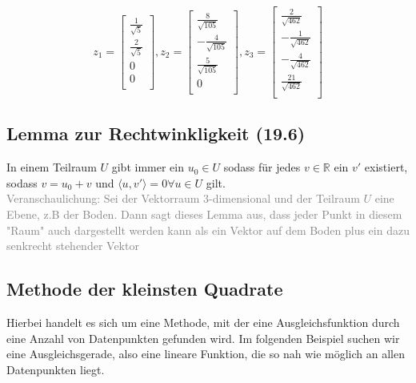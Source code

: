 \documentclass{report}
\begin{document}
				\begin{equation*}
					z_1 = \begin{bmatrix} \frac1{\sqrt{5}} \\ \frac2{\sqrt{5}} \\ 0 \\ 0 \\ \end{bmatrix},
					z_2 = \begin{bmatrix} \frac8{\sqrt{105}} \\ -\frac4{\sqrt{105}} \\ \frac5{\sqrt{105}} \\ 0 \\ \end{bmatrix}, 
					z_3 = \begin{bmatrix} \frac2{\sqrt{462}} \\ -\frac1{\sqrt{462}} \\ -\frac4{\sqrt{462}} \\ \frac{21}{\sqrt{462}} \\ \end{bmatrix}
				\end{equation*}
			\subsection{Lemma zur Rechtwinkligkeit (19.6)}
				In einem Teilraum $U$ gibt immer ein $u_0 \in U$ sodass für jedes $v \in \mathbb{R}$ ein $v'$ existiert, sodass $v = u_0 + v$ und $\langle u, v'\rangle = 0 \forall u \in U$ gilt.\\
				\textcolor{gray}{Veranschaulichung: Sei der Vektorraum 3-dimensional und der Teilraum $U$ eine Ebene, z.B der Boden. Dann sagt dieses Lemma aus, dass jeder Punkt in diesem "Raum" auch dargestellt werden kann als ein Vektor auf dem Boden plus ein dazu senkrecht stehender Vektor}
		\subsection{Methode der kleinsten Quadrate}
			Hierbei handelt es sich um eine Methode, mit der eine Ausgleichsfunktion durch eine Anzahl von Datenpunkten gefunden wird. Im folgenden Beispiel suchen wir eine Ausgleichsgerade, also eine lineare Funktion, die so nah wie möglich an allen Datenpunkten liegt.
\end{document}

